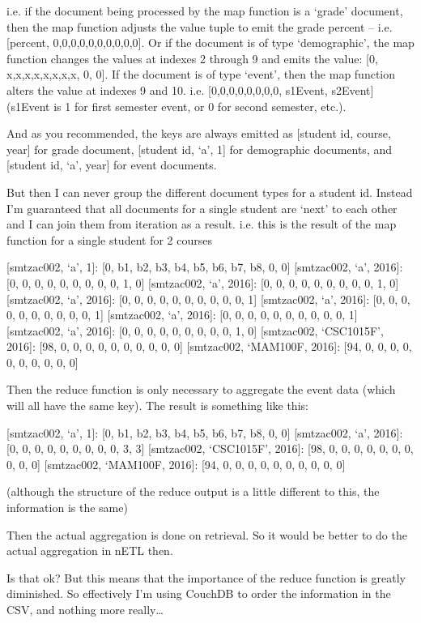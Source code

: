 i.e. if the document being processed by the map function is a ‘grade’ document, then the map function adjusts the value tuple to emit the grade percent – i.e. [percent, 0,0,0,0,0,0,0,0,0,0]. Or if the document is of type ‘demographic’, the map function changes the values at indexes 2 through 9 and emits the value: [0, x,x,x,x,x,x,x,x, 0, 0]. If the document is of type ‘event’, then the map function alters the value at indexes 9 and 10. i.e. [0,0,0,0,0,0,0,0, s1Event, s2Event] (s1Event is 1 for first semester event, or 0 for second semester, etc.).

And as you recommended, the keys are always emitted as [student id, course, year] for grade document, [student id, ‘a’, 1] for demographic documents, and [student id, ‘a’, year] for event documents.

But then I can never group the different document types for a student id. Instead I’m guaranteed that all documents for a single student are ‘next’ to each other and I can join them from iteration as a result. i.e. this is the result of the map function for a single student for 2 courses

    [smtzac002, ‘a’, 1]: [0, b1, b2, b3, b4, b5, b6, b7, b8, 0, 0]
[smtzac002, ‘a’, 2016]: [0, 0, 0, 0, 0, 0, 0, 0, 0, 1, 0]
[smtzac002, ‘a’, 2016]: [0, 0, 0, 0, 0, 0, 0, 0, 0, 1, 0]
[smtzac002, ‘a’, 2016]: [0, 0, 0, 0, 0, 0, 0, 0, 0, 0, 1]
[smtzac002, ‘a’, 2016]: [0, 0, 0, 0, 0, 0, 0, 0, 0, 0, 1]
[smtzac002, ‘a’, 2016]: [0, 0, 0, 0, 0, 0, 0, 0, 0, 0, 1]
[smtzac002, ‘a’, 2016]: [0, 0, 0, 0, 0, 0, 0, 0, 0, 1, 0]
[smtzac002, ‘CSC1015F’, 2016]: [98, 0, 0, 0, 0, 0, 0, 0, 0, 0, 0]
[smtzac002, ‘MAM100F, 2016]: [94, 0, 0, 0, 0, 0, 0, 0, 0, 0, 0]

Then the reduce function is only necessary to aggregate the event data (which will all have the same key). The result is something like this:

[smtzac002, ‘a’, 1]: [0, b1, b2, b3, b4, b5, b6, b7, b8, 0, 0]
[smtzac002, ‘a’, 2016]: [0, 0, 0, 0, 0, 0, 0, 0, 0, 3, 3]
[smtzac002, ‘CSC1015F’, 2016]: [98, 0, 0, 0, 0, 0, 0, 0, 0, 0, 0]
[smtzac002, ‘MAM100F, 2016]: [94, 0, 0, 0, 0, 0, 0, 0, 0, 0, 0]

(although the structure of the reduce output is a little different to this, the information is the same)

Then the actual aggregation is done on retrieval. So it would be better to do the actual aggregation in nETL then.

Is that ok? But this means that the importance of the reduce function is greatly diminished. So effectively I’m using CouchDB to order the information in the CSV, and nothing more really…

